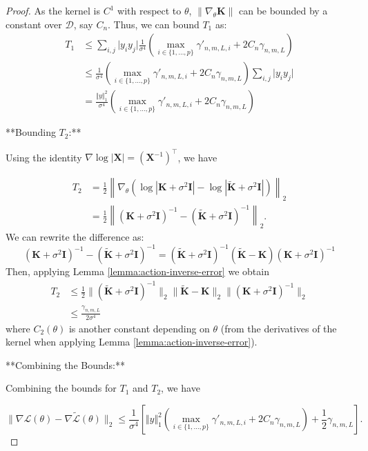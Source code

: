 \begin{proof}
As the kernel is $C^1$ with respect to $\theta$, $\|\nabla_\theta \mathbf{K}\|$ can be bounded by a constant over $\mathcal{D}$, say $C_n$. Thus, we can bound $T_1$ as:
\begin{align*}
T_1 &\leq \sum_{i,j} \vert y_iy_j\vert \frac{1}{\sigma^4} \left(\max_{i \in \{1,\ldots,p\}} \gamma'_{n,m,L,i}+2 C_n\gamma_{n,m,L}\right)\\
&\leq \frac{1}{\sigma^4}\left(\max_{i \in \{1,\ldots,p\}} \gamma'_{n,m,L,i}+2 C_n\gamma_{n,m,L}\right)\sum_{i,j} \vert y_iy_j\vert \\
&=\frac{\Vert y\Vert_1^2}{\sigma^4}\left(\max_{i \in \{1,\ldots,p\}} \gamma'_{n,m,L,i}+2 C_n\gamma_{n,m,L}\right)
\end{align*}

**Bounding $T_2$:**

Using the identity $\nabla \log |\mathbf{X}| = (\mathbf{X}^{-1})^\top$, we have

\begin{align*}
T_2 &= \frac{1}{2} \left\| \nabla_\theta \left( \log |\mathbf{K} + \sigma^2 \mathbf{I}| - \log |\tilde{\mathbf{K}} + \sigma^2 \mathbf{I}| \right) \right\|_2 \\
&= \frac{1}{2} \left\| (\mathbf{K} + \sigma^2 \mathbf{I})^{-1} - (\tilde{\mathbf{K}} + \sigma^2 \mathbf{I})^{-1} \right\|_2.
\end{align*}
We can rewrite the difference as:
$$
(\mathbf{K} + \sigma^2 \mathbf{I})^{-1} - (\tilde{\mathbf{K}} + \sigma^2 \mathbf{I})^{-1} = (\tilde{\mathbf{K}} + \sigma^2 \mathbf{I})^{-1} (\tilde{\mathbf{K}} - \mathbf{K}) (\mathbf{K} + \sigma^2 \mathbf{I})^{-1}
$$
Then, applying Lemma \ref{lemma:action-inverse-error} we obtain
\begin{align*}
    T_2 &\leq \frac{1}{2} \| (\tilde{\mathbf{K}} + \sigma^2 \mathbf{I})^{-1} \|_2 \| \tilde{\mathbf{K}} - \mathbf{K} \|_2 \| (\mathbf{K} + \sigma^2 \mathbf{I})^{-1} \|_2 \\
    &\leq \frac{\gamma_{n,m,L}}{2\sigma^4}
\end{align*}
where $C_2(\theta)$ is another constant depending on $\theta$ (from the derivatives of the kernel when applying Lemma \ref{lemma:action-inverse-error}).

**Combining the Bounds:**

Combining the bounds for $T_1$ and $T_2$, we have

$$
\| \nabla \mathcal{L}(\theta) - \nabla \tilde{\mathcal{L}}(\theta) \|_2 \leq \frac{1}{\sigma^4}\left[\Vert y\Vert_1^2\left(\max_{i \in \{1,\ldots,p\}} \gamma'_{n,m,L,i}+2 C_n\gamma_{n,m,L}\right)+\frac{1}{2}\gamma_{n,m,L}\right].
$$

\end{proof}
